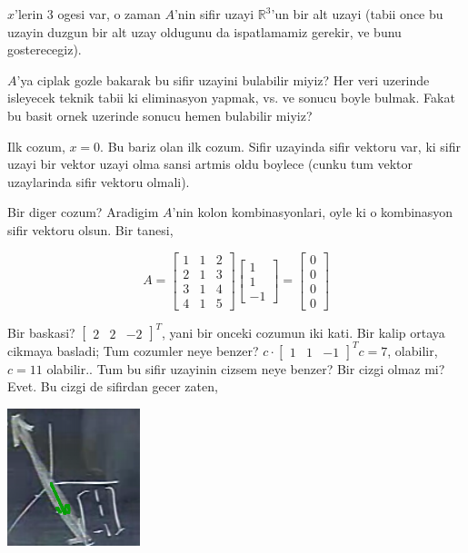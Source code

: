 \documentclass[12pt,fleqn]{article}\usepackage{../common}
\begin{document}
$x$'lerin 3 ogesi var, o zaman $A$'nin sifir uzayi $\mathbb{R}^3$'un bir
alt uzayi (tabii once bu uzayin duzgun bir alt uzay oldugunu da
ispatlamamiz gerekir, ve bunu gosterecegiz). 

$A$'ya ciplak gozle bakarak bu sifir uzayini bulabilir miyiz? Her veri
uzerinde isleyecek teknik tabii ki eliminasyon yapmak, vs. ve sonucu boyle
bulmak. Fakat bu basit ornek uzerinde sonucu hemen bulabilir miyiz? 

Ilk cozum, $x=0$. Bu bariz olan ilk cozum. Sifir uzayinda sifir vektoru
var, ki sifir uzayi bir vektor uzayi olma sansi artmis oldu boylece (cunku
tum vektor uzaylarinda sifir vektoru olmali). 

Bir diger cozum? Aradigim $A$'nin kolon kombinasyonlari, oyle ki o
kombinasyon sifir vektoru olsun. Bir tanesi,

$$ A = 
\left[\begin{array}{rrr}
1 & 1 & 2 \\
2 & 1 & 3 \\
3 & 1 & 4 \\
4 & 1 & 5 
\end{array}\right]
\left[\begin{array}{r}
1  \\
1  \\
-1  
\end{array}\right] 
=
\left[\begin{array}{r}
0  \\
0  \\
0  \\
0  
\end{array}\right]
 $$

Bir baskasi? $\left[\begin{array}{rrr}2 & 2 & -2\end{array}\right]^T$, yani bir onceki cozumun iki kati. Bir kalip ortaya 
cikmaya basladi; Tum cozumler neye benzer? $c \cdot \left[\begin{array}{rrr}1 & 1 &
    -1\end{array}\right]^T$$c=7$, olabilir, $c=11$ 
olabilir.. Tum bu sifir uzayinin cizsem neye benzer? Bir cizgi olmaz mi? Evet. Bu
cizgi de sifirdan gecer zaten, 

\includegraphics[height=4cm]{6_02.png}
\end{document}
